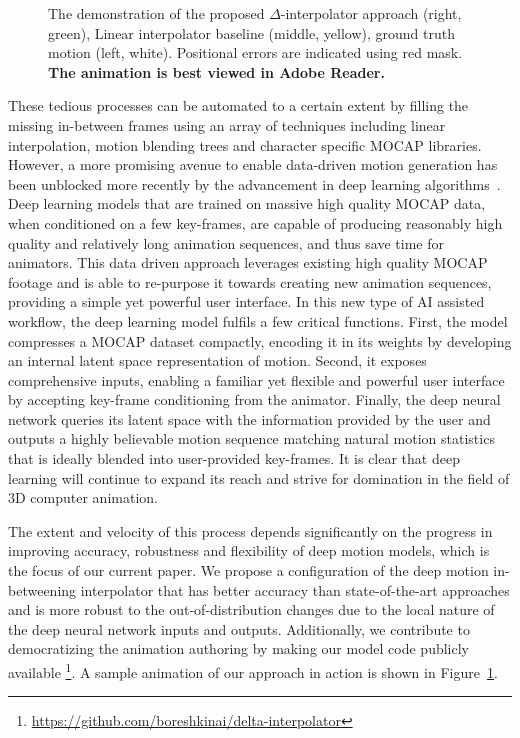 \documentclass[letterpaper]{article} \usepackage[]{aaai23}  \usepackage{times}  \usepackage{helvet}  \usepackage{courier}  \usepackage[hyphens]{url}  \usepackage{graphicx} \urlstyle{rm} \def\UrlFont{\rm}  \usepackage{natbib}  \usepackage{caption} \frenchspacing  \setlength{\pdfpagewidth}{8.5in} \setlength{\pdfpageheight}{11in}
\begin{document}
\begin{figure}[ht]
    \centering
    \caption{The demonstration of the proposed $\Delta$-interpolator approach (right, green), Linear interpolator baseline (middle, yellow), ground truth motion (left, white). Positional errors are indicated using red mask. \textbf{The animation is best viewed in Adobe Reader.}}
    \label{fig:animation_demo}
\end{figure}



These tedious processes can be automated to a certain extent by filling the missing in-between frames using an array of techniques including linear interpolation, motion blending trees and character specific MOCAP libraries. However, a more promising avenue to enable data-driven motion generation has been unblocked more recently by the advancement in deep learning algorithms~\cite{harvey2020robust,duan2021singleshot}. Deep learning models that are trained on massive high quality MOCAP data, when conditioned on a few key-frames, are capable of producing reasonably high quality and relatively long animation sequences, and thus save time for animators. This data driven approach leverages existing high quality MOCAP footage and is able to re-purpose it towards creating new animation sequences, providing a simple yet powerful user interface. In this new type of AI assisted workflow, the deep learning model fulfils a few critical functions. First, the model compresses a MOCAP dataset compactly, encoding it in its weights by developing an internal latent space representation of motion. Second, it exposes comprehensive inputs, enabling a familiar yet flexible and powerful user interface by accepting key-frame conditioning from the animator. Finally, the deep neural network queries its latent space with the information provided by the user and outputs a highly believable motion sequence matching natural motion statistics that is ideally blended into user-provided key-frames. It is clear that deep learning will continue to expand its reach and strive for domination in the field of 3D computer animation. 

The extent and velocity of this process depends significantly on the progress in improving accuracy, robustness and flexibility of deep motion models, which is the focus of our current paper. We propose a configuration of the deep motion in-betweening interpolator that has better accuracy than state-of-the-art approaches and is more robust to the out-of-distribution changes due to the local nature of the deep neural network inputs and outputs. 
Additionally, we contribute to democratizing the animation authoring by making our model code publicly available
\footnote{\url{https://github.com/boreshkinai/delta-interpolator}}.
A sample animation of our approach in action is shown in Figure~\ref{fig:animation_demo}.
\end{document}
